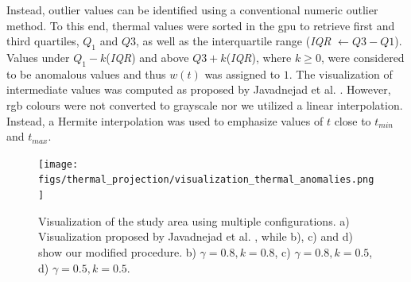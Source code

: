 Instead, outlier values can be identified using a conventional numeric outlier method. To this end, thermal values were sorted in the \acrshort{gpu} to retrieve first and third quartiles, $Q_1$ and $Q3$, as well as the interquartile range (\textit{IQR} $\gets Q3 - Q1$). Values under $Q_1 - k$(\textit{IQR}) and above $Q3 + k$(\textit{IQR}), where $k \geq 0$, were considered to be anomalous values and thus $w(t)$ was assigned to $1$. The visualization of intermediate values was computed as proposed by Javadnejad et al. \cite{javadnejad_photogrammetric_2020}. However, \acrshort{rgb} colours were not converted to grayscale nor we utilized a linear interpolation. Instead, a Hermite interpolation was used to emphasize values of $t$ close to $t_{\textit{min}}$ and $t_{\textit{max}}$. 

\begin{figure}[ht]
	\centering
	\texttt{[image: figs/thermal\_projection/visualization\_thermal\_anomalies.png]}
	\caption{Visualization of the study area using multiple configurations. a) Visualization proposed by Javadnejad et al. \cite{javadnejad_photogrammetric_2020}, while b), c) and d) show our modified procedure. b) $\gamma = 0.8, k = 0.8$, c) $\gamma = 0.8, k = 0.5$, d) $\gamma = 0.5, k = 0.5$.}
	\label{fig:visualization_thermal_anomalies}
\end{figure}

